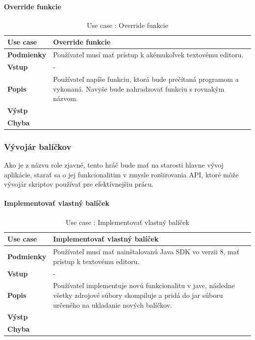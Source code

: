\paragraph{Override funkcie}
\begin{center}
	\begin{table}[htbp]
		\begin{tabular}{|p{2.5cm}|p{14cm}|}
			\hline
			\textbf{Use case} & Override funkcie \\ 
			\hline
			\textbf{Podmienky} & Používateľ musí mať prístup k akémukoľvek textovému editoru.  \\ 
			\hline
			\textbf{Vstup} & -\\
			\hline
			\textbf{Popis} & Používateľ napíše funkciu, ktorá bude prečítaná programom a vykonaná. Navyše bude nahradzovať funkciu s rovnakým názvom.\\ 
			\hline
			\textbf{Výstp} & \\
			\hline
			\textbf{Chyba} & \\
			\hline
		\end{tabular}
		\label{table:1}
		\caption{Use case : Override funkcie}
	\end{table}
\end{center}
\subsubsection{Vývojár balíčkov}
\indent Ako je z názvu role zjavné, tento hráč bude mať na starosti hlavne vývoj aplikácie, starať sa o jej funkcionalitim v zmysle rozširovania API, ktoré môže vývojár skriptov používať pre efektívnejšiu prácu.
\paragraph{Implementovať vlastný balíček}
\begin{center}
	\begin{table}[htbp]
		\begin{tabular}{|p{2.5cm}|p{14cm}|}
			\hline
			\textbf{Use case} & Implementovať vlastný balíček \\ 
			\hline
			\textbf{Podmienky} & Používateľ musí mať nainštalovanú Java SDK vo verzii 8, mať prístup k textovému editoru.  \\ 
			\hline
			\textbf{Vstup} & -\\
			\hline
			\textbf{Popis} & Používateľ implementuje novú funkcionalitu v jave, následne všetky zdrojové súbory skompiluje a pridá do jar súboru určeného na ukladanie nových balíčkov.\\ 
			\hline
			\textbf{Výstp} & \\
			\hline
			\textbf{Chyba} & \\
			\hline
		\end{tabular}
		\label{table:1}
		\caption{Use case : Implementovať vlastný balíček}
	\end{table}
\end{center}
\newpage
